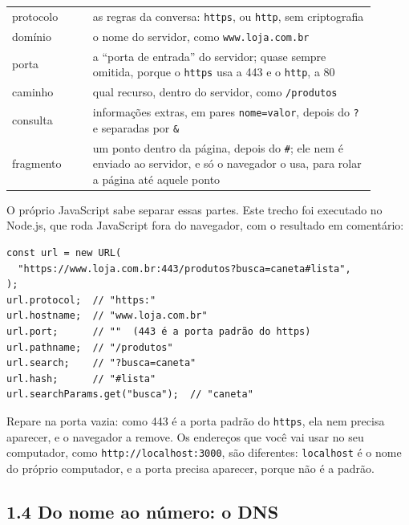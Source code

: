 \begin{center}
\begin{tabular}{@{}P{0.2\linewidth}P{0.7\linewidth}@{}}
\toprule
{}
 &  \\
\midrule
protocolo & as regras da conversa: \texttt{https}, ou \texttt{http}, sem criptografia \\
 domínio & o nome do servidor, como \texttt{www.loja.com.br} \\
porta & a ``porta de entrada'' do servidor; quase sempre omitida, porque o \texttt{https} usa a 443 e o \texttt{http}, a 80 \\
 caminho & qual recurso, dentro do servidor, como \texttt{/produtos} \\
consulta & informações extras, em pares \texttt{nome=valor}, depois do \texttt{?} e separadas por \texttt{\&} \\
 fragmento & um ponto dentro da página, depois do \texttt{\#}; ele nem é enviado ao servidor, e só o navegador o usa, para rolar a página até aquele ponto \\
\bottomrule
\end{tabular}
\end{center}

O próprio JavaScript sabe separar essas partes. Este trecho foi executado no Node.js, que roda JavaScript fora do navegador, com o resultado em comentário:

\begin{codigo}
\begin{Verbatim}[breaklines=true, breaksymbolleft={}, fontsize=\footnotesize]
const url = new URL(
  "https://www.loja.com.br:443/produtos?busca=caneta#lista",
);
url.protocol;  // "https:"
url.hostname;  // "www.loja.com.br"
url.port;      // ""  (443 é a porta padrão do https)
url.pathname;  // "/produtos"
url.search;    // "?busca=caneta"
url.hash;      // "#lista"
url.searchParams.get("busca");  // "caneta"
\end{Verbatim}
\end{codigo}

Repare na porta vazia: como 443 é a porta padrão do \texttt{https}, ela nem precisa aparecer, e o navegador a remove. Os endereços que você vai usar no seu computador, como \texttt{http://localhost:3000}, são diferentes: \texttt{localhost} é o nome do próprio computador, e a porta precisa aparecer, porque não é a padrão.

\subsection{1.4 Do nome ao número: o DNS}

